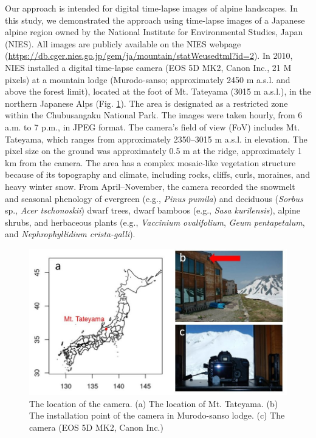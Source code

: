 \documentclass{article}
\begin{document}
Our approach is intended for digital time-lapse images of alpine landscapes. In this study, we demonstrated the approach using time-lapse images of a Japanese alpine region owned by the National Institute for Environmental Studies, Japan (NIES). All images are publicly available on the NIES webpage (\url{https://db.cger.nies.go.jp/gem/ja/mountain/statWeusedtml?id=2}). In 2010, NIES installed a digital time-lapse camera (EOS 5D MK2, Canon Inc., 21 M pixels) at a mountain lodge (Murodo-sanso; approximately 2450 m a.s.l. and above the forest limit), located at the foot of Mt. Tateyama (3015 m a.s.l.), in the northern Japanese Alps (Fig. \ref{fig:map}). The area is designated as a restricted zone within the Chubusangaku National Park. The images were taken hourly, from 6 a.m. to 7 p.m., in JPEG format. The camera's field of view (FoV) includes Mt. Tateyama, which ranges from approximately 2350–3015 m a.s.l. in elevation. The pixel size on the ground was approximately 0.5 m at the ridge, approximately 1 km from the camera. The area has a complex mosaic-like vegetation structure because of its topography and climate, including rocks, cliffs, curls, moraines, and heavy winter snow. From April–November, the camera recorded the snowmelt and seasonal phenology of evergreen (e.g., \emph{Pinus pumila}) and deciduous (\emph{Sorbus} sp., \emph{Acer tschonoskii}) dwarf trees, dwarf bamboos (e.g., \emph{Sasa kurilensis}), alpine shrubs, and herbaceous plants (e.g., \emph{Vaccinium ovalifolium}, \emph{Geum pentapetalum}, and \emph{Nephrophyllidium crista-galli}).

\begin{figure}
\includegraphics[width=1\linewidth]{paper_files/figures/Slide3} \caption{The location of the camera. (a) The location of Mt. Tateyama. (b) The installation point of the camera in Murodo-sanso lodge. (c) The camera (EOS 5D MK2, Canon Inc.)}\label{fig:map}
\end{figure}
\end{document}
